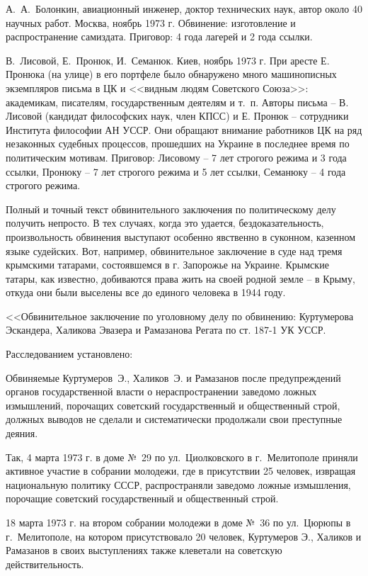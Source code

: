 \documentclass{book}
\begin{document}
А.~А.~Болонкин, авиационный инженер, доктор технических наук, автор около 40 научных работ. Москва, ноябрь 1973 г. Обвинение: изготовление и распространение самиздата. Приговор: 4 года лагерей и 2 года ссылки.

В.~Лисовой, Е.~Пронюк, И.~Семанюк. Киев, ноябрь 1973 г. При аресте Е. Пронюка (на улице) в его портфеле было обнаружено много машинописных экземпляров письма в ЦК и <<видным людям Советского Союза>>: академикам, писателям, государственным деятелям и т.~п. Авторы письма -- В. Лисовой (кандидат философских наук, член КПСС) и Е. Пронюк -- сотрудники Института философии АН УССР. Они обращают внимание работников ЦК на ряд незаконных судебных про­цессов, прошедших на Украине в последнее время по политическим мотивам. Приговор: Лисовому -- 7 лет строгого режи­ма и 3 года ссылки, Пронюку -- 7 лет строгого режима и 5 лет ссылки, Семанюку -- 4 года строгого режима.

Полный и точный текст обвинительного заключения по политическому делу получить непросто. В тех случаях, когда это удается, бездоказательность, произвольность обвинения выступают особенно явственно в суконном, казенном языке судейских. Вот, например, обвинительное заключение в суде над тремя крымскими татарами, состоявшемся в г. Запорожье на Украине. Крымские татары, как известно, добиваются права жить на своей родной земле -- в Крыму, откуда они были выселены все до единого человека в 1944 году.

<<Обвинительное заключение по уголовному делу по обвинению: Куртумерова Эскандера, Халикова Эвазера и Рамазанова Регата по ст. 187-1 УК УССР.

Расследованием установлено:

Обвиняемые Куртумеров~Э., Халиков~Э. и Рамазанов после предупреждений органов государственной власти о нераспространении заведомо ложных измышлений, порочащих советский государственный и общественный строй, должных выводов не сделали и систематически продолжали свои преступные деяния.

Так, 4 марта 1973 г. в доме №~29 по ул.~Циолковского в г.~Мелитополе приняли активное участие в собрании молодежи, где в присутствии 25 человек, извращая национальную политику СССР, распространяли заведомо ложные измышления, порочащие советский государственный и общественный строй.

18 марта 1973 г. на втором собрании молодежи в доме №~36 по ул.~Цюрюпы в г.~Мелитополе, на котором присутствовало 20 человек, Куртумеров Э., Халиков и Рамазанов в своих выступлениях также клеветали на советскую действительность.
\end{document}
